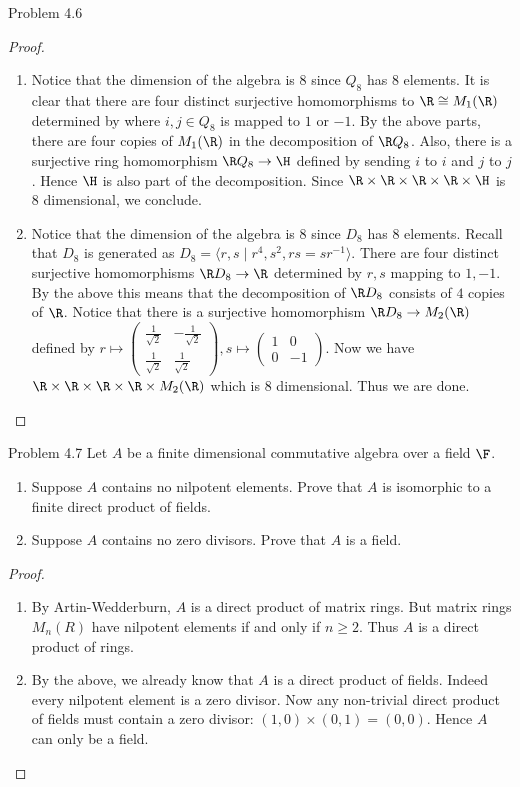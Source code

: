 \documentclass[a4paper]{article}
\begin{document}
\begin{ex}{Problem 4.6}{}
\begin{proof}
\begin{enumerate}
\item Notice that the dimension of the algebra is $8$ since $Q_8$ has $8$ elements. It is clear that there are four distinct surjective homomorphisms to $\R\cong M_1(\R)$ determined by where $i,j\in Q_8$ is mapped to $1$ or $-1$. By the above parts, there are four copies of $M_1(\R)$ in the decomposition of $\R Q_8$. Also, there is a surjective ring homomorphism $\R Q_8\to\H$ defined by sending $i$ to $i$ and $j$ to $j$. Hence $\H$ is also part of the decomposition. Since $\R\times\R\times\R\times\R\times\H$ is $8$ dimensional, we conclude. 
\item Notice that the dimension of the algebra is $8$ since $D_8$ has $8$ elements. Recall that $D_8$ is generated as $D_8=\langle r,s\;|\;r^4,s^2,rs=sr^{-1}\rangle$. There are four distinct surjective homomorphisms $\R D_8\to\R$ determined by $r,s$ mapping to $1,-1$. By the above this means that the decomposition of $\R D_8$ consists of $4$ copies of $\R$. Notice that there is a surjective homomorphism $\R D_8\to M_2(\R)$ defined by $r\mapsto\begin{pmatrix}\frac{1}{\sqrt2}&-\frac{1}{\sqrt2}\\\frac{1}{\sqrt2}&\frac{1}{\sqrt2}\end{pmatrix},s\mapsto\begin{pmatrix}1&0\\0&-1\end{pmatrix}$. Now we have $\R\times\R\times\R\times\R\times M_2(\R)$ which is $8$ dimensional. Thus we are done. 
\end{enumerate}
\end{proof}
\end{ex}

\begin{ex}{Problem 4.7}{} Let $A$ be a finite dimensional commutative algebra over a field $\F$. 
\begin{enumerate}
\item Suppose $A$ contains no nilpotent elements. Prove that $A$ is isomorphic to a finite direct product of fields. 
\item Suppose $A$ contains no zero divisors. Prove that $A$ is a field. 
\end{enumerate} 
\begin{proof}~\\
\begin{enumerate}
\item By Artin-Wedderburn, $A$ is a direct product of matrix rings. But matrix rings $M_n(R)$ have nilpotent elements if and only if $n\geq 2$. Thus $A$ is a direct product of rings. 
\item By the above, we already know that $A$ is a direct product of fields. Indeed every nilpotent element is a zero divisor. Now any non-trivial direct product of fields must contain a zero divisor: $(1,0)\times(0,1)=(0,0)$. Hence $A$ can only be a field. 
\end{enumerate}
\end{proof}
\end{ex}
\end{document}
